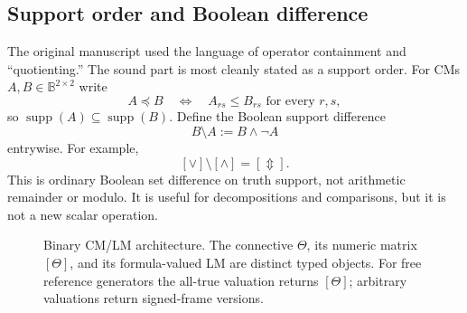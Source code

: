 \documentclass[11pt]{article}
\theoremstyle{definition}
\theoremstyle{remark}
\newcommand{\B}{\mathbb B}
\begin{document}
\subsection{Support order and Boolean difference}

The original manuscript used the language of operator containment and ``quotienting.''  The sound part is most cleanly stated as a support order.  For CMs $A,B\in\B^{2\times2}$ write
\[
 A\preceq B
 \quad\Longleftrightarrow\quad
 A_{rs}\le B_{rs}\text{ for every }r,s,
\]
so $\operatorname{supp}(A)\subseteq\operatorname{supp}(B)$.  Define the Boolean support difference
\begin{equation}
 B\setminus A:=B\land\neg A
 \label{eq:supportdifference}
\end{equation}
entrywise.  For example,
\[
 [\lor]\setminus[\land]=[\Updownarrow].
\]
This is ordinary Boolean set difference on truth support, not arithmetic remainder or modulo.  It is useful for decompositions and comparisons, but it is not a new scalar operation.

\begin{figure}[ht]
\centering
{}
\caption{Binary CM/LM architecture.  The connective $\Theta$, its numeric matrix $[\Theta]$, and its formula-valued LM are distinct typed objects.  For free reference generators the all-true valuation returns $[\Theta]$; arbitrary valuations return signed-frame versions.}
\label{fig:binaryarchitecture}
\end{figure}
\end{document}
